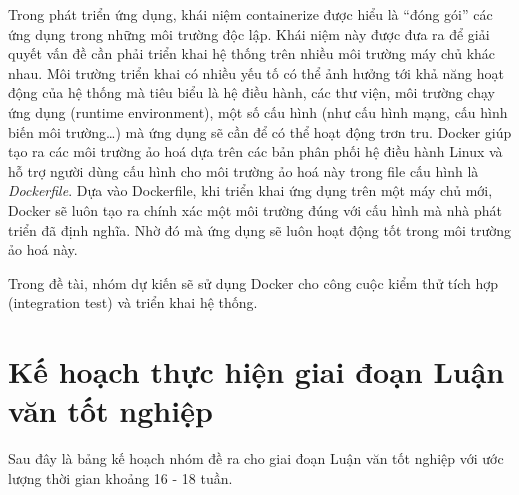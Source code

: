 \documentclass[../main.tex]{subfiles}
\begin{document}
	Trong phát triển ứng dụng, khái niệm containerize được hiểu là ``đóng gói'' các ứng dụng trong những môi trường độc
	lập. Khái niệm này được đưa ra để giải quyết vấn đề cần phải triển khai hệ thống trên nhiều môi trường máy chủ khác
	nhau. Môi trường triển khai có nhiều yếu tố có thể ảnh hưởng tới khả năng hoạt động của hệ thống mà tiêu biểu là hệ
	điều hành, các thư viện, môi trường chạy ứng dụng (runtime environment), một số cấu hình (như cấu hình mạng, cấu hình
	biến môi trường\ldots) mà ứng dụng sẽ cần để có thể hoạt động trơn tru. Docker giúp tạo ra các môi trường ảo hoá dựa
	trên các bản phân phối hệ điều hành Linux và hỗ trợ người dùng cấu hình cho môi trường ảo hoá này trong file cấu hình
	là \emph{Dockerfile}. Dựa vào Dockerfile, khi triển khai ứng dụng trên một máy chủ mới, Docker sẽ luôn tạo ra chính
	xác một môi trường đúng với cấu hình mà nhà phát triển đã định nghĩa. Nhờ đó mà ứng dụng sẽ luôn hoạt động tốt trong
	môi trường ảo hoá này.

	Trong đề tài, nhóm dự kiến sẽ sử dụng Docker cho công cuộc kiểm thử tích hợp (integration test) và triển khai hệ
	thống.

	\newpage


	\section{Kế hoạch thực hiện giai đoạn Luận văn tốt nghiệp}

	Sau đây là bảng kế hoạch nhóm đề ra cho giai đoạn Luận văn tốt nghiệp với ước lượng thời gian khoảng 16 - 18 tuần.
\end{document}
